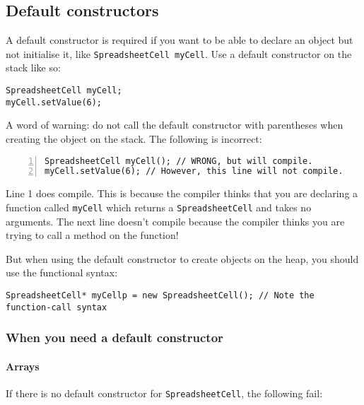 \documentclass[a4paper,12pt]{article}
\begin{document}
\subsection{Default constructors}
A default constructor is required if you want to be able to declare an object but not initialise it, like \lstinline|SpreadsheetCell myCell|. Use a default constructor on the stack like so:

\begin{lstlisting}
SpreadsheetCell myCell;
myCell.setValue(6);
\end{lstlisting}

A word of warning: do not call the default constructor with parentheses when creating the object on the stack. The following is incorrect:

\begin{lstlisting}[numbers=left]
SpreadsheetCell myCell(); // WRONG, but will compile.
myCell.setValue(6); // However, this line will not compile.
\end{lstlisting}

Line 1 does compile. This is because the compiler thinks that you are declaring a function called \lstinline|myCell| which returns a \lstinline|SpreadsheetCell| and takes no arguments. The next line doesn't compile because the compiler thinks you are trying to call a method on the function!
\vspace{\baselineskip}
\begin{center}
  \noindent{}
\end{center}
\vspace{\baselineskip}
But when using the default constructor to create objects on the heap, you should use the functional syntax:

\begin{lstlisting}
SpreadsheetCell* myCellp = new SpreadsheetCell(); // Note the function-call syntax
\end{lstlisting}

\subsubsection{When you need a default constructor}
\paragraph{Arrays}
If there is no default constructor for \lstinline|SpreadsheetCell|, the following fail:
\end{document}
